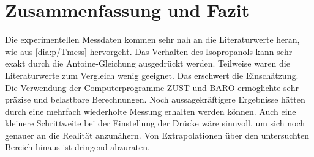 \section{Zusammenfassung und Fazit}
\label{sec:zusammenfassung}

Die experimentellen Messdaten kommen sehr nah an die Literaturwerte heran, wie aus \ref{dia:p/Tmess} hervorgeht. Das Verhalten des Isopropanols kann sehr exakt durch die Antoine-Gleichung ausgedrückt werden. Teilweise waren die Literaturwerte zum Vergleich wenig geeignet. Das erschwert die Einschätzung. Die Verwendung der Computerprogramme ZUST und BARO ermöglichte sehr präzise und belastbare Berechnungen. Noch aussagekräftigere Ergebnisse hätten durch eine mehrfach wiederholte Messung erhalten werden können. Auch eine kleinere Schrittweite bei der Einstellung der Drücke wäre sinnvoll, um sich noch genauer an die Realität anzunähern. Von Extrapolationen über den untersuchten Bereich hinaus ist dringend abzuraten.